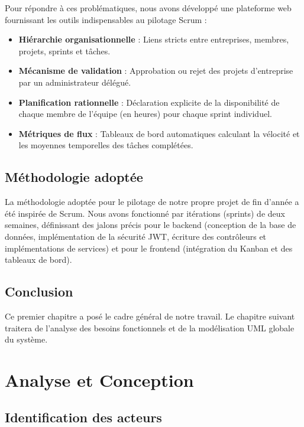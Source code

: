 \documentclass[12pt,a4paper]{report}
\begin{document}
Pour répondre à ces problématiques, nous avons développé une plateforme web fournissant les outils indispensables au pilotage Scrum :
\begin{itemize}
\item \textbf{Hiérarchie organisationnelle} : Liens stricts entre entreprises, membres, projets, sprints et tâches.
\item \textbf{Mécanisme de validation} : Approbation ou rejet des projets d'entreprise par un administrateur délégué.
\item \textbf{Planification rationnelle} : Déclaration explicite de la disponibilité de chaque membre de l'équipe (en heures) pour chaque sprint individuel.
\item \textbf{Métriques de flux} : Tableaux de bord automatiques calculant la vélocité et les moyennes temporelles des tâches complétées.
\end{itemize}

\section{Méthodologie adoptée}

La méthodologie adoptée pour le pilotage de notre propre projet de fin d'année a été inspirée de Scrum. Nous avons fonctionné par itérations (sprints) de deux semaines, définissant des jalons précis pour le backend (conception de la base de données, implémentation de la sécurité JWT, écriture des contrôleurs et implémentations de services) et pour le frontend (intégration du Kanban et des tableaux de bord).

\section{Conclusion}

Ce premier chapitre a posé le cadre général de notre travail. Le chapitre suivant traitera de l'analyse des besoins fonctionnels et de la modélisation UML globale du système.


\chapter{Analyse et Conception}

\section{Identification des acteurs}
\end{document}
